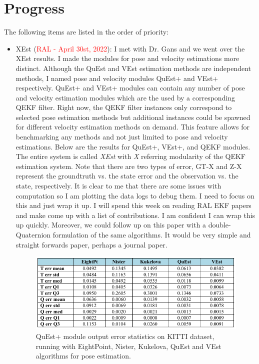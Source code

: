 \documentclass[11pt]{article}
\begin{document}
\section{Progress}
The following items are listed in the order of priority:
\begin{itemize}
    \item XEst (\textcolor{red}{RAL - April 30st, 2022}): I met with Dr. Gans
    and we went over the XEst results. I made the modules for pose and velocity
    estimations more distinct. Although the QuEst and VEst estimation methods
    are independent methods, I named pose and velocity modules QuEst+ and VEst+
    respectively. QuEst+ and VEst+ modules can contain any number of pose and
    velocity estimation modules which are the used by a corresponding QEKF filter.
    Right now, the QEKF filter instances only correspond to selected pose estimation
    methods but additional instances could be spawned for different velocity
    estimation methods on demand. This feature allows for benchmarking any
    methods and not just limited to pose and velocity estimations. Below are
    the results for QuEst+, VEst+, and QEKF modules. The entire system is called
    \emph{XEst} with \emph{X} referring modularity of the QEKF estimation system.
    Note that there are two types of error, GT-X and Z-X represent the
    groundtruth vs. the state error and the observation vs. the state, respectively.
    It is clear to me that there are some issues with computation so I am plotting
    the data logs to debug them. I need to focus on this and just wrap it up. I
    will spend this week on reading RAL EKF papers and make come up with a list
    of contributions. I am confident I can wrap this up quickly. Moreover, we
    could follow up on this paper with a double-Quaternion formulation of the
    same algorithms. It would be very simple and straight forwards paper, perhaps
    a journal paper.

    \begin{figure}[H]
      \begin{center}
        \includegraphics[width=\linewidth]{fig01_QuEstP.png}
      \end{center}
      \caption{QuEst+ module output error statistics on KITTI dataset, running with EightPoint, Nister, Kukelova, QuEst and VEst algorithms for pose estimation.}
    \end{figure}


\end{itemize}
\end{document}
